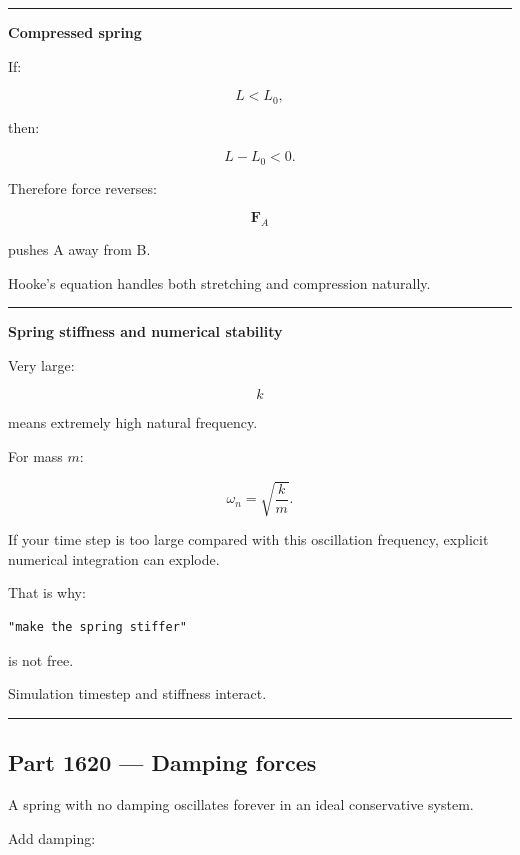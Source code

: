 \begin{center}\rule{0.5\linewidth}{0.5pt}\end{center}

\textbf{Compressed spring}

If:

\[
L<L_0,
\]

then:

\[
L-L_0<0.
\]

Therefore force reverses:

\[
\mathbf{F}_A
\]

pushes A away from B.

Hooke's equation handles both stretching and compression naturally.

\begin{center}\rule{0.5\linewidth}{0.5pt}\end{center}

\textbf{Spring stiffness and numerical stability}

Very large:

\[
k
\]

means extremely high natural frequency.

For mass \(m\):

\[
\omega_n
=
\sqrt{\frac{k}{m}}.
\]

If your time step is too large compared with this oscillation frequency, explicit numerical integration can explode.

That is why:

\begin{verbatim}
"make the spring stiffer"
\end{verbatim}

is not free.

Simulation timestep and stiffness interact.

\begin{center}\rule{0.5\linewidth}{0.5pt}\end{center}

\subsection{Part 1620 --- Damping forces}\label{06-engine-ii-ch034-part-1620-damping-forces}

\hypertarget{06-engine-ii-ch034-part-1620-damping-forces}{}

A spring with no damping oscillates forever in an ideal conservative system.

Add damping:

